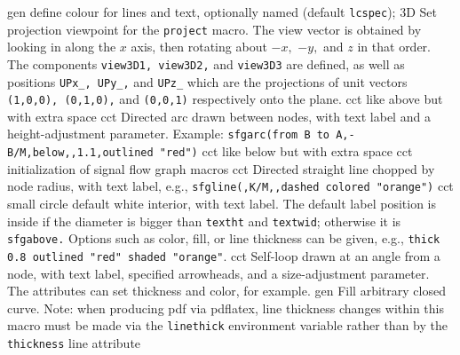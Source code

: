 %
  {gen}%
  {define colour for lines and text, optionally named (default
   {\tt lcspec}); }%
%
  {3D} {Set projection viewpoint for the {\tt project} macro.
   The view vector is obtained by looking in along the $x$ axis,
   then rotating about $-x,$ $-y,$ and $z$ in that order.  The components
   {\tt view3D1, view3D2,} and {\tt view3D3} are defined, as well as
   positions {\tt UPx\_, UPy\_,} and {\tt UPz\_} which are the projections
   of unit vectors {\tt (1,0,0), (0,1,0),} and {\tt (0,0,1)} respectively
   onto the plane.}%
%
  {cct}%
  {like above but with extra space}%
%
  {cct}%
  {Directed arc drawn between nodes, with text label
    and a height-adjustment parameter. Example:
    {\tt sfgarc(from B to A,-B/M,below,{,}1.1,outlined "red")} }%
%
  {cct}%
  {like below but with extra space}%
 {cct}%
  {initialization of signal
  flow graph macros}%
%
  {cct}%
  {Directed straight line chopped by node radius, with text label,
   e.g., {\tt sfgline(,K/M,{,}dashed colored "orange")} }%
%
  {cct}%
  {small circle default white interior, with text label. The default
  label position is inside if the diameter is bigger than {\tt textht}%
  and {\tt textwid}; otherwise it is {\tt sfgabove.} Options such as
  color, fill, or line thickness can be given, e.g.,
  {\tt thick 0.8 outlined "red" shaded "orange"}. }%
%
  {cct}%
  {Self-loop drawn at an angle from a node,
     with text label, specified arrowheads, and a size-adjustment parameter.
     The attributes can set thickness and color, for example. }%
%
  {gen}%
  {Fill arbitrary closed curve. Note: when producing pdf via pdflatex, line
   thickness changes within this macro must be made via the {\tt linethick}%
   environment variable rather than by the {\tt thickness} line attribute}%
